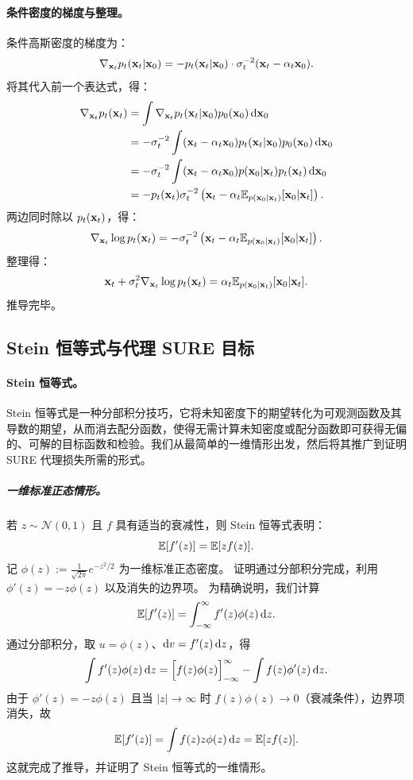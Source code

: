 \paragraph{条件密度的梯度与整理。}
条件高斯密度的梯度为：
\begin{align*}
\nabla_{{\mathbf{x}}_t} p_t({\mathbf{x}}_t|{\mathbf{x}}_0) 
= -p_t({\mathbf{x}}_t|{\mathbf{x}}_0) \cdot \sigma_t^{-2} ({\mathbf{x}}_t - \alpha_t {\mathbf{x}}_0).
\end{align*}
将其代入前一个表达式，得：
\begin{align*}
\nabla_{{\mathbf{x}}_t} p_t({\mathbf{x}}_t) 
&= \int \nabla_{{\mathbf{x}}_t} p_t({\mathbf{x}}_t|{\mathbf{x}}_0)  p_0({\mathbf{x}}_0)  \mathop{}\!\mathrm{d}{\mathbf{x}}_0 \\
&= -\sigma_t^{-2} \int ({\mathbf{x}}_t - \alpha_t {\mathbf{x}}_0)  p_t({\mathbf{x}}_t|{\mathbf{x}}_0)  p_0({\mathbf{x}}_0)  \mathop{}\!\mathrm{d}{\mathbf{x}}_0 \\
&= -\sigma_t^{-2} \int ({\mathbf{x}}_t - \alpha_t {\mathbf{x}}_0)  p({\mathbf{x}}_0|{\mathbf{x}}_t)  p_t({\mathbf{x}}_t)  \mathop{}\!\mathrm{d}{\mathbf{x}}_0 \\
&= -p_t({\mathbf{x}}_t)  \sigma_t^{-2} \left({\mathbf{x}}_t - \alpha_t  \mathbb{E}_{p({\mathbf{x}}_0|{\mathbf{x}}_t)}[{\mathbf{x}}_0\vert {\mathbf{x}}_t] \right).
\end{align*}
两边同时除以 $p_t({\mathbf{x}}_t)$，得：
\begin{align*}
\nabla_{{\mathbf{x}}_t} \log p_t({\mathbf{x}}_t) 
= -\sigma_t^{-2} \left({\mathbf{x}}_t - \alpha_t  \mathbb{E}_{p({\mathbf{x}}_0|{\mathbf{x}}_t)}[{\mathbf{x}}_0\vert {\mathbf{x}}_t] \right).
\end{align*}
整理得：
\begin{align*}
{\mathbf{x}}_t + \sigma_t^{2} \nabla_{{\mathbf{x}}_t} \log p_t({\mathbf{x}}_t) 
= \alpha_t  \mathbb{E}_{p({\mathbf{x}}_0|{\mathbf{x}}_t)}[{\mathbf{x}}_0\vert {\mathbf{x}}_t].
\end{align*}
推导完毕。

\subsection{Stein 恒等式与代理 SURE 目标}\label{app-sec:stein-identity}

\paragraph{Stein 恒等式。} Stein 恒等式是一种分部积分技巧，它将未知密度下的期望转化为可观测函数及其导数的期望，从而消去配分函数，使得无需计算未知密度或配分函数即可获得无偏的、可解的目标函数和检验。我们从最简单的一维情形出发，然后将其推广到证明 SURE 代理损失所需的形式。
\subparagraph{一维标准正态情形。}
若 $z \sim \mathcal{N}(0,1)$ 且 $f$ 具有适当的衰减性，则 Stein 恒等式表明：
\[
\mathbb{E}[f'(z)]  =  \mathbb{E}[z f(z)] .
\]
记 $\phi(z) := \tfrac{1}{\sqrt{2\pi}}  e^{-z^2/2}$ 为一维标准正态密度。
证明通过分部积分完成，利用 $\phi'(z) = -z\phi(z)$ 以及消失的边界项。
为精确说明，我们计算
\[
\mathbb{E}[f'(z)] 
= \int_{-\infty}^{\infty} f'(z)  \phi(z)  \mathop{}\!\mathrm{d} z.
\]
通过分部积分，取 $u=\phi(z)$、$\mathop{}\!\mathrm{d} v=f'(z)  \mathop{}\!\mathrm{d} z$，得
\[
\int f'(z)  \phi(z)  \mathop{}\!\mathrm{d} z
= \Big[ f(z)  \phi(z) \Big]_{-\infty}^{\infty}
- \int f(z)  \phi'(z)  \mathop{}\!\mathrm{d} z.
\]
由于 $\phi'(z) = -z\phi(z)$ 且当 $|z|\to\infty$ 时 $f(z)\phi(z)\to 0$（衰减条件），边界项消失，故
\[
\mathbb{E}[f'(z)]  =  \int f(z)  z  \phi(z)  \mathop{}\!\mathrm{d} z  =  \mathbb{E}[z f(z)].
\]
这就完成了推导，并证明了 Stein 恒等式的一维情形。



